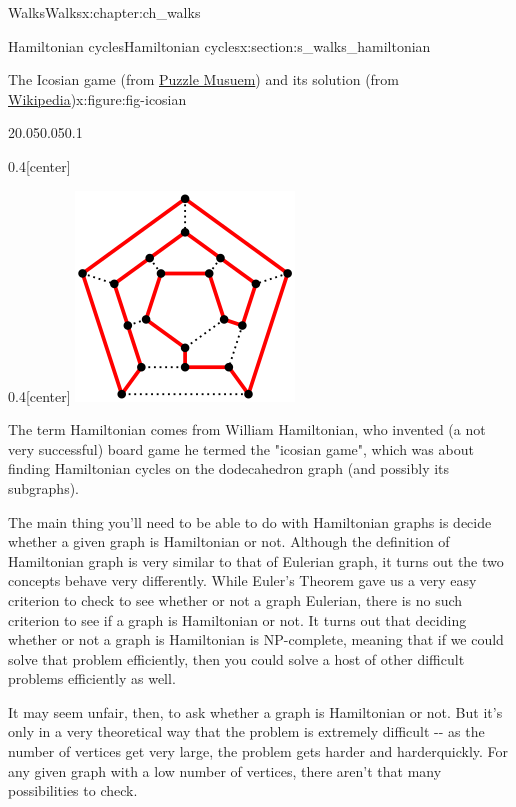 \documentclass[oneside,10pt,]{book}
\numberwithin{equation}{section}
\begin{document}
\begin{chapterptx}{Walks}{}{Walks}{}{}{x:chapter:ch_walks}
\begin{sectionptx}{Hamiltonian cycles}{}{Hamiltonian cycles}{}{}{x:section:s_walks_hamiltonian}
\begin{figureptx}{The Icosian game (from \href{https://www.puzzlemuseum.com/month/picm02/200207icosian.htm}{Puzzle Musuem}) and its solution (from \href{https://en.wikipedia.org/wiki/Icosian_game}{Wikipedia})}{x:figure:fig-icosian}{}
\begin{sidebyside}{2}{0.05}{0.05}{0.1}
\begin{sbspanel}{0.4}[center]
\end{sbspanel}%
\begin{sbspanel}{0.4}[center]%
\includegraphics[width=\linewidth]{images/icosiansolved.png}
\end{sbspanel}%
\end{sidebyside}%
\tcblower
\end{figureptx}%
The term Hamiltonian comes from William Hamiltonian, who invented (a not very successful) board game he termed the "icosian game", which was about finding Hamiltonian cycles on the dodecahedron graph (and possibly its subgraphs).%
\par
The main thing you'll need to be able to do with Hamiltonian graphs is decide whether a given graph is Hamiltonian or not.  Although the definition of Hamiltonian graph is very similar to that of Eulerian graph, it turns out the two concepts behave very differently.  While Euler's Theorem gave us a very easy criterion to check to see whether or not a graph Eulerian, there is no such criterion to see if a graph is Hamiltonian or not.  It turns out that deciding whether or not a graph is Hamiltonian is NP-complete, meaning that if we could solve that problem efficiently, then you could solve a host of other difficult problems efficiently as well.%
\par
It may seem unfair, then, to ask whether a graph is Hamiltonian or not.  But it's only in a very theoretical way that the problem is extremely difficult -{}-{} as the number of vertices get very large, the problem gets harder and harderquickly.  For any given graph with a low number of vertices, there aren't that many possibilities to check.%

\end{sectionptx}
\end{chapterptx}
\end{document}
